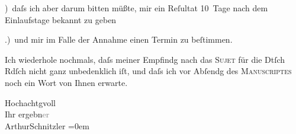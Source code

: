 ) daſs ich aber darum bitten müßte, mir ein Reſultat  10 Tage nach dem Einlaufstage bekannt zu geben\pend
           
.) und mir im Falle der Annahme einen Termin zu {\pb}beſtimmen.\pend
           
\pstart
           Ich wiederhole nochmals, daſs meiner Empfindg nach das \textsc{Sujet} für die Dtſch Rdſch nicht ganz
               unbedenklich iſt, und daſs ich vor Abſendg des \textsc{Manuscriptes} noch ein Wort von Ihnen erwarte.\pend
           
\pstart
           Hochachtgvoll{\\[\baselineskip]} Ihr ergebn\textcolor{gray}{er}{\\[\baselineskip]}\spacefill\mbox{ArthurSchnitzler}\pend
           \leftskip=0em{}\endnumbering{}  \newcommand{\dateiname}{L01048}\newcommand{\titel}{Arthur Schnitzler an Julius Rodenberg, 21. 6. 1900}\newcommand{\editorInnen}{Martin Anton Müller und Gerd-Hermann Susen}
